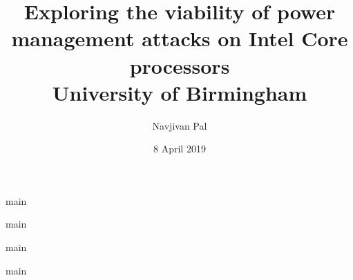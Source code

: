 



\title{
    {Exploring the viability of power management attacks on Intel Core processors}\\
    {\large University of Birmingham}
}
\author{Navjivan Pal}
\date{8 April 2019}

\maketitle



\tableofcontents
\newpage

{main}

{main}

{main}

{main}

\printbibliography


